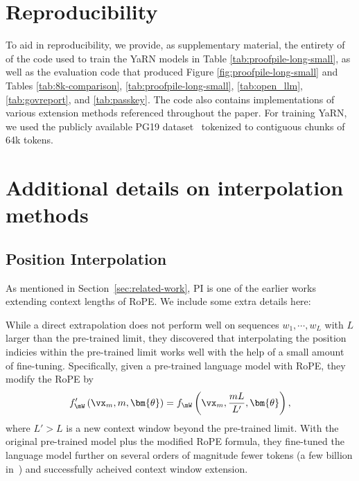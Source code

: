 \documentclass{article} %
\begin{document}
\section{Reproducibility}

To aid in reproducibility, we provide, as supplementary material, the entirety of of the code used to train the YaRN models in Table \ref{tab:proofpile-long-small}, as well as the evaluation code that produced Figure \ref{fig:proofpile-long-small} and Tables \ref{tab:8k-comparison}, \ref{tab:proofpile-long-small}, \ref{tab:open_llm}, \ref{tab:govreport}, and \ref{tab:passkey}. The code also contains implementations of various extension methods referenced throughout the paper. For training YaRN, we used the publicly available PG19 dataset~\citep{Rae2020Compressive} tokenized to contiguous chunks of 64k tokens.




\newpage

\appendix

\section{Additional details on interpolation methods}

\subsection{Position Interpolation}\label{appendix:pi}
As mentioned in Section~\ref{sec:related-work}, PI is one of the earlier works extending context lengths of RoPE. We include some extra details here:

While a direct extrapolation does not perform well on sequences $w_1, \cdots, w_L$ with $L$ larger than the pre-trained limit, they discovered that interpolating the position indicies within the pre-trained limit works well with the help of a small amount of fine-tuning.
Specifically, given a pre-trained language model with RoPE, they modify the RoPE by
\begin{align} \label{ropeeq}
    f'_\mW\left(\vx_m, m, \bm{\theta}\right) = f_\mW\left(\vx_m, \dfrac{mL}{L'}, \bm{\theta}\right),
\end{align}
where $L' > L$ is a new context window beyond the pre-trained limit.
With the original pre-trained model plus the modified RoPE formula, they fine-tuned the language model further on several orders of magnitude fewer tokens (a few billion in~\citet{chen2023extending}) and successfully acheived context window extension.
\end{document}
